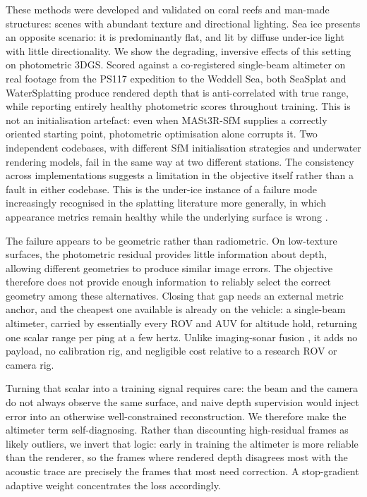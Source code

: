 \documentclass[conference]{IEEEtran}
\begin{document}
These methods were developed and validated on coral reefs and man-made
structures: scenes with abundant texture and directional lighting. Sea ice
presents an opposite scenario: it is predominantly flat, and lit by diffuse under-ice
light with little directionality. We show the degrading, inversive effects of this setting on photometric 3DGS. Scored against a
co-registered single-beam altimeter on real footage from the PS117 expedition to the Weddell Sea, both SeaSplat and WaterSplatting produce rendered depth that is anti-correlated with true range, while
reporting entirely healthy photometric scores throughout training. This is not an initialisation artefact: even when MASt3R-SfM \cite{duisterhof2024mast3rsfm} supplies a correctly
oriented starting point, photometric optimisation alone corrupts it. Two independent codebases, with different SfM initialisation strategies and underwater rendering models, fail in the same way at two different stations. The consistency across implementations suggests a limitation in the objective itself rather than a fault in either codebase. This is the under-ice instance of a failure mode
increasingly recognised in the splatting literature more generally, in which
appearance metrics remain healthy while the underlying surface is wrong
\cite{huang20242dgs, guedon2024sugar}.

The failure appears to be geometric rather than radiometric. On low-texture surfaces, the photometric residual provides little information about depth, allowing different geometries to produce similar image errors. The objective therefore does not provide enough information to reliably select the correct geometry among these alternatives.
Closing that gap needs an external metric anchor, and the cheapest one available is already
on the vehicle: a single-beam altimeter, carried by essentially every ROV
and AUV for altitude hold, returning one scalar range per ping at a few
hertz. Unlike imaging-sonar fusion \cite{qadri2024aoneus, qu2024zsplat, chen2025sonarsweep},
it adds no payload, no calibration rig, and negligible cost relative to a
research ROV or camera rig.

Turning that scalar into a training signal requires care: the beam and the
camera do not always observe the same surface, and naive depth supervision
would inject error into an otherwise well-constrained reconstruction. We
therefore make the altimeter term self-diagnosing. Rather than discounting
high-residual frames as likely outliers, we invert that logic: early in training the altimeter is more reliable
than the renderer, so the frames where rendered depth disagrees most with
the acoustic trace are precisely the frames that most need correction. A
stop-gradient adaptive weight concentrates the loss accordingly.
\end{document}

